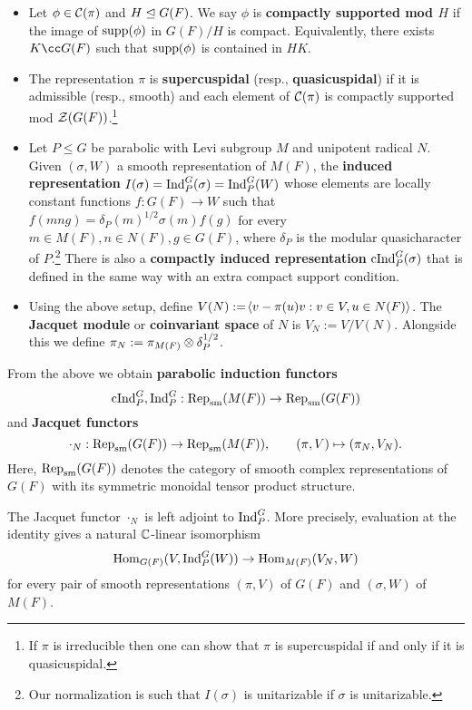 \documentclass[11pt]{article}
\newcommand{\cInd}{\textup{cInd}} %
\newcommand{\Ind}{\textup{Ind}} %
\newcommand{\Rep}{\textup{Rep}}
\newcommand{\sm}{\textup{sm}}
\newcommand{\supp}{\textup{supp}}
\begin{document}
\begin{definition}
\hfill
\begin{itemize}
\item Let $\phi\in\mathcal{C}(\pi)$ and $H\trianglelefteq G(F)$. We say $\phi$ is \textbf{compactly supported mod $H$} if the image of $\supp(\phi)$ in $G(F)/H$ is compact. Equivalently, there exists $K\cc G(F)$ such that $\supp(\phi)$ is contained in $HK$.

\item The representation $\pi$ is \textbf{supercuspidal} (resp., \textbf{quasicuspidal}) if it is admissible (resp., smooth) and each element of $\mathcal{C}(\pi)$ is compactly supported mod $\mathcal{Z}(G(F))$.\footnote{If $\pi$ is irreducible then one can show that $\pi$ is supercuspidal if and only if it is quasicuspidal.} %

\item Let $P\leq G$ be parabolic with Levi subgroup $M$ and unipotent radical $N$. Given $(\sigma,W)$ a smooth representation of $M(F)$, the \textbf{induced representation} $I(\sigma)=\Ind_P^G(\sigma)=\Ind_P^G(W)$ whose elements are locally constant functions $f: G(F)\to W$ such that $f(mng)=\delta_P(m)^{1/2}\sigma(m)f(g)$ for every $m\in M(F),n\in N(F),g\in G(F)$, where $\delta_P$ is the modular quasicharacter of $P$.\footnote{Our normalization is such that $I(\sigma)$ is unitarizable if $\sigma$ is unitarizable.} There is also a \textbf{compactly induced representation} $\cInd_P^G(\sigma)$ that is defined in the same way with an extra compact support condition.

\item Using the above setup, define $V(N):=\!\left\langle v-\pi(u)v : v\in V,u\in N(F)\right\rangle$. The \textbf{Jacquet module} or \textbf{coinvariant space} of $N$ is $V_N:=V/V(N)$. Alongside this we define $\pi_N:=\pi_{M(F)}\otimes\delta_P^{1/2}$. 
\end{itemize}
\end{definition}

From the above we obtain \textbf{parabolic induction functors} 
$$\cInd_P^G,\Ind_P^G: \Rep_{\sm}(M(F))\to\Rep_{\sm}(G(F))$$ and \textbf{Jacquet functors} 
$$\cdot_N: \Rep_{\sm}(G(F))\to\Rep_{\sm}(M(F)), \qquad(\pi,V)\mapsto(\pi_N,V_N).$$
Here, $\Rep_{\sm}(G(F))$ denotes the category of smooth complex representations of $G(F)$ with its symmetric monoidal tensor product structure.

\begin{theorem}
The Jacquet functor $\cdot_N$ is left adjoint to $\Ind_P^G$. More precisely, evaluation at the identity gives a natural $\mathbb{C}$-linear isomorphism
$$\Hom_{G(F)}(V,\Ind_P^G(W))\to\Hom_{M(F)}(V_N,W)$$
for every pair of smooth representations $(\pi,V)$ of $G(F)$ and $(\sigma,W)$ of $M(F)$.
\end{theorem}
\end{document}
